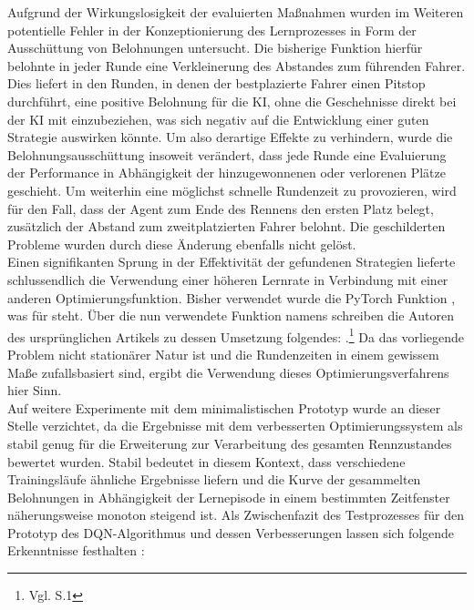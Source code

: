 Aufgrund der Wirkungslosigkeit der evaluierten Maßnahmen wurden im Weiteren potentielle Fehler in der Konzeptionierung des Lernprozesses in Form der Ausschüttung von Belohnungen untersucht. Die bisherige Funktion hierfür belohnte in jeder Runde eine Verkleinerung des Abstandes zum führenden Fahrer. Dies liefert in den Runden, in denen der bestplazierte Fahrer einen Pitstop durchführt, eine positive Belohnung für die KI, ohne die Geschehnisse direkt bei der KI mit einzubeziehen, was sich negativ auf die Entwicklung einer guten Strategie auswirken könnte. Um also derartige Effekte zu verhindern, wurde die Belohnungsausschüttung insoweit verändert, dass jede Runde eine Evaluierung der Performance in Abhängigkeit der hinzugewonnenen oder verlorenen Plätze geschieht. Um weiterhin eine möglichst schnelle Rundenzeit zu provozieren, wird für den Fall, dass der Agent zum Ende des Rennens den ersten Platz belegt, zusätzlich der Abstand zum zweitplatzierten Fahrer belohnt. Die geschilderten Probleme wurden durch diese Änderung ebenfalls nicht gelöst.\\
Einen signifikanten Sprung in der Effektivität der gefundenen Strategien lieferte schlussendlich die Verwendung einer höheren Lernrate in Verbindung mit einer anderen Optimierungsfunktion. Bisher verwendet wurde die PyTorch Funktion , was für  steht. Über die nun verwendete Funktion namens  schreiben die Autoren des ursprünglichen Artikels zu dessen Umsetzung folgendes: .\footnote{Vgl. \cite{adam_optimizer} S.1} Da das vorliegende Problem nicht stationärer Natur ist und die Rundenzeiten in einem gewissem Maße zufallsbasiert sind, ergibt die Verwendung dieses Optimierungsverfahrens hier Sinn.\\
Auf weitere Experimente mit dem minimalistischen Prototyp wurde an dieser Stelle verzichtet, da die Ergebnisse mit dem verbesserten Optimierungssystem als stabil genug für die Erweiterung zur Verarbeitung des gesamten Rennzustandes bewertet wurden. Stabil bedeutet in diesem Kontext, dass verschiedene Trainingsläufe ähnliche Ergebnisse liefern und die Kurve der gesammelten Belohnungen in Abhängigkeit der Lernepisode in einem bestimmten Zeitfenster näherungsweise monoton steigend ist.
Als Zwischenfazit des Testprozesses für den Prototyp des DQN-Algorithmus und dessen Verbesserungen lassen sich folgende Erkenntnisse festhalten :
